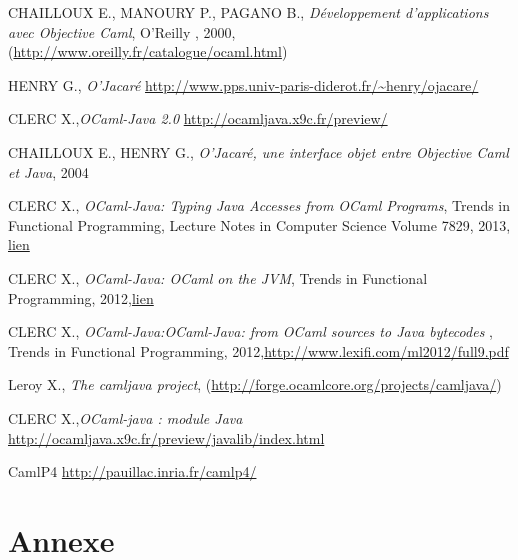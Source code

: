 \documentclass[a4paper, 11pt]{article}
\begin{document}
\begin{thebibliography}{}
 CHAILLOUX E., MANOURY P., PAGANO B., \emph{Développement
  d'applications avec Objective Caml}, O'Reilly
, 2000, (\url{http://www.oreilly.fr/catalogue/ocaml.html})

 HENRY G., \emph{O’Jacaré} \url{http://www.pps.univ-paris-diderot.fr/~henry/ojacare/}

 CLERC X.,\emph{OCaml-Java 2.0} \url{http://ocamljava.x9c.fr/preview/}

 CHAILLOUX E., HENRY G., \emph{O’Jacaré, une interface objet
  entre Objective Caml et Java}, 2004

 CLERC X., \emph{OCaml-Java: Typing Java Accesses from OCaml
  Programs}, Trends in Functional Programming, Lecture Notes in
Computer Science Volume 7829,
2013, \href{http://www.cs.ru.nl/P.Achten/IFL2013/symposium_proceedings_IFL2013/ifl2013_submission_17.pdf}{lien}

 CLERC X., \emph{OCaml-Java: OCaml on the JVM}, Trends in
Functional Programming,
2012,\href{}{lien}

 CLERC X., \emph{OCaml-Java:OCaml-Java: from OCaml sources to Java bytecodes }, Trends in Functional Programming, 2012,\url{http://www.lexifi.com/ml2012/full9.pdf}

 Leroy X., \emph{The camljava project},
(\url{http://forge.ocamlcore.org/projects/camljava/})

 CLERC X.,\emph{OCaml-java : module Java} \url{http://ocamljava.x9c.fr/preview/javalib/index.html}

 CamlP4 \url{http://pauillac.inria.fr/camlp4/}


\end{thebibliography}



























\newpage
\section{Annexe}
\end{document}
